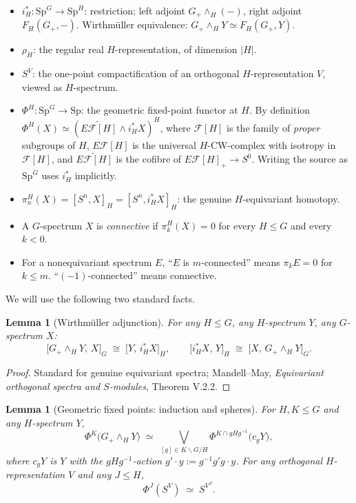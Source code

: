 \documentclass[12pt]{article}
\newtheorem{lemma}[theorem]{Lemma}
\theoremstyle{definition}
\newcommand{\SpG}{\mathrm{Sp}^{G}}
\newcommand{\SpH}{\mathrm{Sp}^{H}}
\newcommand{\Spec}{\mathrm{Sp}}
\newcommand{\PhiH}{\Phi^{H}}
\newcommand{\PhiK}{\Phi^{K}}
\newcommand{\fix}[1]{\widetilde{E\mathcal{F}[#1]}}
\newcommand{\Esub}[1]{E\mathcal{F}[#1]}
\begin{document}
\begin{itemize}
\item $i_{H}^{\ast}\colon \SpG\to\SpH$: restriction; left adjoint
$G_{+}\wedge_{H}(-)$, right adjoint $F_{H}(G_{+},-)$. Wirthmüller equivalence:
$G_{+}\wedge_{H}Y\simeq F_{H}(G_{+},Y)$.
\item $\rho_{H}$: the regular real $H$-representation, of dimension $|H|$.
\item $S^{V}$: the one-point compactification of an orthogonal
$H$-representation $V$, viewed as $H$-spectrum.
\item $\PhiH\colon \SpG\to\Spec$: the geometric fixed-point functor at $H$.
By definition $\PhiH(X)\simeq(\fix{H}\wedge i_{H}^{\ast}X)^{H}$, where
$\mathcal{F}[H]$ is the family of \emph{proper} subgroups of $H$, $\Esub{H}$ is
the universal $H$-CW-complex with isotropy in $\mathcal{F}[H]$, and $\fix{H}$
is the cofibre of $\Esub{H}_{+}\to S^{0}$. Writing the source as $\SpG$ uses
$i_{H}^{\ast}$ implicitly.
\item $\pi_{n}^{H}(X)=[S^{n},X]_{H}=[S^{n},i_{H}^{\ast}X]_{H}$: the genuine
$H$-equivariant homotopy.
\item A $G$-spectrum $X$ is \emph{connective} if $\pi_{k}^{H}(X)=0$ for every
$H\leq G$ and every $k<0$.
\item For a nonequivariant spectrum $E$, ``$E$ is $m$-connected'' means
$\pi_{k}E=0$ for $k\leq m$. ``$(-1)$-connected'' means connective.
\end{itemize}

We will use the following two standard facts.

\begin{lemma}[Wirthmüller adjunction]\label{lem:wirth}
For any $H\leq G$, any $H$-spectrum $Y$, any $G$-spectrum $X$:
\begin{equation}
\bigl[G_{+}\wedge_{H}Y,\,X\bigr]_{G}\;\cong\;\bigl[Y,\,i_{H}^{\ast}X\bigr]_{H},
\qquad
\bigl[i_{H}^{\ast}X,\,Y\bigr]_{H}\;\cong\;\bigl[X,\,G_{+}\wedge_{H}Y\bigr]_{G}.
\label{eq:wirth}
\end{equation}
\end{lemma}

\begin{proof}
Standard for genuine equivariant spectra; Mandell--May, \emph{Equivariant
orthogonal spectra and $S$-modules}, Theorem V.2.2.
\end{proof}

\begin{lemma}[Geometric fixed points: induction and spheres]\label{lem:dcp}
For $H,K\leq G$ and any $H$-spectrum $Y$,
\begin{equation}
\PhiK\bigl(G_{+}\wedge_{H}Y\bigr)
\;\simeq\;\bigvee_{[g]\in K\backslash G/H}\Phi^{K\cap gHg^{-1}}\bigl(c_{g}Y\bigr),
\label{eq:dcp}
\end{equation}
where $c_{g}Y$ is $Y$ with the $gHg^{-1}$-action $g'\cdot y:=g^{-1}g'g\cdot y$.
For any orthogonal $H$-representation $V$ and any $J\leq H$,
\begin{equation}
\Phi^{J}(S^{V})\;\simeq\;S^{V^{J}}.
\label{eq:phi-sphere}
\end{equation}
\end{lemma}
\end{document}
